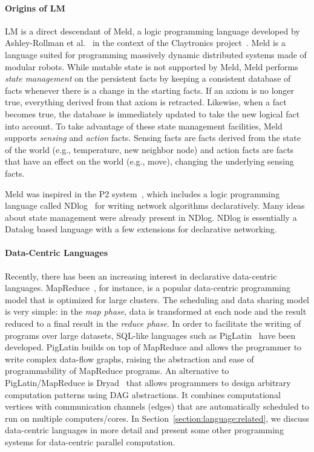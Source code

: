 \paragraph{Origins of LM}

LM is a direct descendant of Meld, a logic programming language developed by
Ashley-Rollman et
al.~\cite{ashley-rollman-iclp09,ashley-rollman-derosa-iros07wksp} in the context
of the Claytronics project~\cite{goldstein-computer05}. Meld is a language
suited for programming massively dynamic distributed systems made of modular
robots. While mutable state is not supported by Meld, Meld performs \emph{state
management} on the persistent facts by keeping a consistent database of facts
whenever there is a change in the starting facts. If an axiom is no longer true,
everything derived from that axiom is retracted. Likewise, when a fact becomes
true, the database is immediately updated to take the new logical fact into
account. To take advantage of these state management facilities, Meld supports
\emph{sensing} and \emph{action} facts. Sensing facts are facts derived from the
state of the world (e.g., temperature, new neighbor node) and action facts are
facts that have an effect on the world (e.g., move), changing the underlying
sensing facts.

Meld was inspired in the P2 system~\cite{Loo-condie-garofalakis-p2}, which
includes a logic programming language called NDlog~\cite{Loo:EECS-2006-177} for
writing network algorithms declaratively. Many ideas about state management were
already present in NDlog.  NDlog is essentially a Datalog based language with a
few extensions for declarative networking.

\paragraph{Data-Centric Languages}

Recently, there has been an increasing interest in declarative data-centric
languages. MapReduce~\cite{Dean:2008:MSD:1327452.1327492}, for instance, is a
popular data-centric programming model that is optimized for large clusters. The
scheduling and data sharing model is very simple: in the \emph{map phase}, data
is transformed at each node and the result reduced to a final result in the
\emph{reduce phase}. In order to facilitate the writing of programs over large
datasets, SQL-like languages such as
PigLatin~\cite{Olston:2008:PLN:1376616.1376726} have been developed. PigLatin
builds on top of MapReduce and allows the programmer to write complex data-flow
graphs, raising the abstraction and ease of programmability of MapReduce
programs. An alternative to PigLatin/MapReduce is
Dryad~\cite{Isard:2007:DDD:1272996.1273005} that allows programmers to design
arbitrary computation patterns using DAG abstractions. It combines computational
vertices with communication channels (edges) that are automatically scheduled to
run on multiple computers/cores. In Section~\ref{section:language:related}, we
discuss data-centric languages in more detail and present some other programming
systems for data-centric parallel computation.

